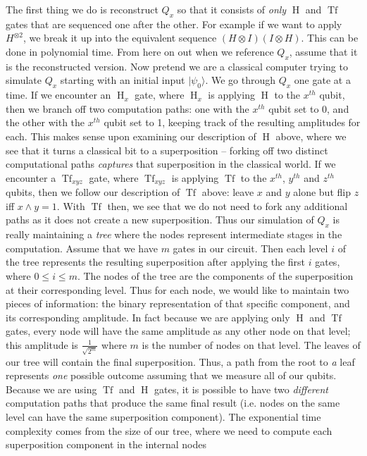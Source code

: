 \documentclass[11pt]{article}
\newcommand{\h}{\operatorname{H}}
\newcommand{\tf}{\operatorname{Tf}}
\newcommand{\ket}[1]{\lvert #1 \rangle}
\begin{document}
\noindent The first thing we do is reconstruct $Q_x$ so that it consists of \emph{only} $\h$ and $\tf$ gates that are sequenced one after the other. For example if we want to apply $H^{\otimes 2}$, we break it up into the equivalent sequence $(H \otimes I)(I \otimes H)$. This can be done in polynomial time. From here on out when we reference $Q_x$, assume that it is the reconstructed version. Now pretend we are a classical computer trying to simulate $Q_x$ starting with an initial input $\ket{\psi_0}$. We go through $Q_x$ one gate at a time. If we encounter an $\h_x$ gate, where $\h_x$ is applying $\h$ to the $x^{th}$ qubit, then we branch off two computation paths: one with the $x^{th}$ qubit set to 0, and the other with the $x^{th}$ qubit set to 1, keeping track of the resulting amplitudes for each. This makes sense upon examining our description of $\h$ above, where we see that it turns a classical bit to a superposition -- forking off two distinct computational paths \emph{captures} that superposition in the classical world. If we encounter a $\tf_{xyz}$ gate, where $\tf_{xyz}$ is applying $\tf$ to the $x^{th}$, $y^{th}$ and $z^{th}$ qubits, then we follow our description of $\tf$ above: leave $x$ and $y$ alone but flip $z$ iff $x \land y = 1$. With $\tf$ then, we see that we do not need to fork any additional paths as it does not create a new superposition. Thus our simulation of $Q_x$ is really maintaining a \emph{tree} where the nodes represent intermediate stages in the computation. Assume that we have $m$ gates in our circuit. Then each level $i$ of the tree represents the resulting superposition after applying the first $i$ gates, where $0 \leq i \leq m$. The nodes of the tree are the components of the superposition at their corresponding level. Thus for each node, we would like to maintain two pieces of information: the binary representation of that specific component, and its corresponding amplitude. In fact because we are applying only $\h$ and $\tf$ gates, every node will have the same amplitude as any other node on that level; this amplitude is $\frac{1}{\sqrt{2^m}}$ where $m$ is the number of nodes on that level. The leaves of our tree will contain the final superposition. Thus, a path from the root to \emph{a} leaf represents \emph{one} possible outcome assuming that we measure all of our qubits. Because we are using $\tf$ and $\h$ gates, it is possible to have two \emph{different} computation paths that produce the same final result (i.e. nodes on the same level can have the same superposition component). The exponential time complexity comes from the size of our tree, where we need to compute each superposition component in the internal nodes  
\end{document}
